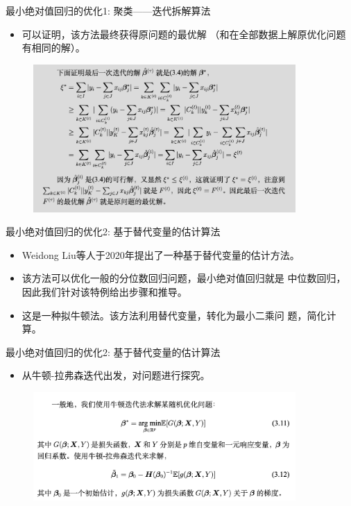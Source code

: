 \begin{frame}{最小绝对值回归的优化1: 聚类——迭代拆解算法}
    \begin{itemize}
        \item 可以证明，该方法最终获得原问题的最优解
        （和在全部数据上解原优化问题有相同的解）。
    \end{itemize}
\begin{figure}[H]
\includegraphics[width=10cm]{pics/proof-aid.png}
\end{figure}
\end{frame}

\begin{frame}{最小绝对值回归的优化2: 基于替代变量的估计算法}
    \begin{itemize}
        \item Weidong Liu等人于2020年提出了一种基于替代变量的估计方法。
        \item 该方法可以优化一般的分位数回归问题，最小绝对值回归就是
        中位数回归，因此我们针对该特例给出步骤和推导。
        \item 这是一种拟牛顿法。该方法利用替代变量，转化为最小二乘问
        题，简化计算。
    \end{itemize}
\end{frame}

\begin{frame}{最小绝对值回归的优化2: 基于替代变量的估计算法}
    \begin{itemize}
        \item 从牛顿-拉弗森迭代出发，对问题进行探究。
    \end{itemize}
\begin{figure}[H]
\includegraphics[width=10cm]{pics/step1.png}
\end{figure}
\end{frame}

